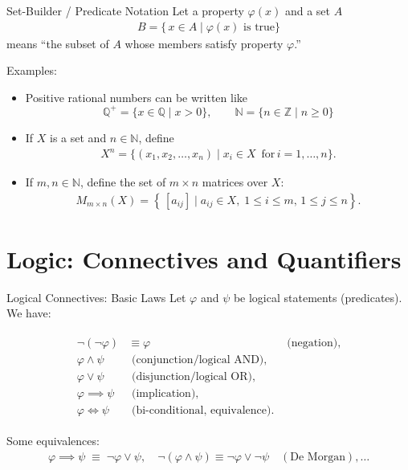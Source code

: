 \begin{frame}{Set-Builder / Predicate Notation}
Let a property $\varphi(x)$ and a set $A$
\begin{align*}
  B = \{\, x \in A \mid \varphi(x) \text{ is true} \}
\end{align*}
means “the subset of \(A\) whose members satisfy property \(\varphi\).”


\begin{block}{Examples:}
\vspace{-0.2cm}

\begin{itemize}
    \item Positive rational numbers can be written like
    $$\mathbb{Q}^{+} = \{ x \in \mathbb{Q} \mid x > 0\}, \qquad
  \mathbb{N} = \{ n \in \mathbb{Z} \mid n \ge 0 \}$$
\item If \(X\) is a set and \(n \in \mathbb{N}\), define
\begin{align*}
  X^n = \{ (x_1, x_2, \dots, x_n) \mid x_i \in X \, \, \,\text{for}\, i = 1,\dots,n\}.
\end{align*}
\item If \(m,n \in \mathbb{N}\), define the set of \(m\times n\) matrices over \(X\):
\begin{align*}
  M_{m \times n}(X) = \left\{\, [a_{ij}] \mid a_{ij} \in X,\; 1 \le i \le m,\,1 \le j \le n\right\}.
\end{align*}
\end{itemize}
   
\end{block}
\end{frame}

\section{Logic: Connectives and Quantifiers}

\begin{frame}{Logical Connectives: Basic Laws}
Let \(\varphi\) and \(\psi\) be logical statements (predicates). We have:
\begin{block}{}
\hspace{-2cm}
\begin{align*}
\begin{aligned}
\neg (\neg \varphi) &\equiv \varphi &\text{ (negation)}, \\
\varphi \land \psi &\text{ (conjunction/logical AND)}, \\
\varphi \lor \psi &\text{ (disjunction/logical OR)}, \\
\varphi \implies \psi &\text{ (implication)}, \\
\varphi \iff \psi &\text{ (bi-conditional, equivalence)}.
\end{aligned}
\end{align*}    
\end{block}

Some equivalences:
\begin{align*}
\varphi \implies \psi \;\equiv\; \neg \varphi \lor \psi, \quad
\neg(\varphi \land \psi) \equiv \neg \varphi \lor \neg \psi \quad (\text{De Morgan}), \dots
\end{align*}
\end{frame}

